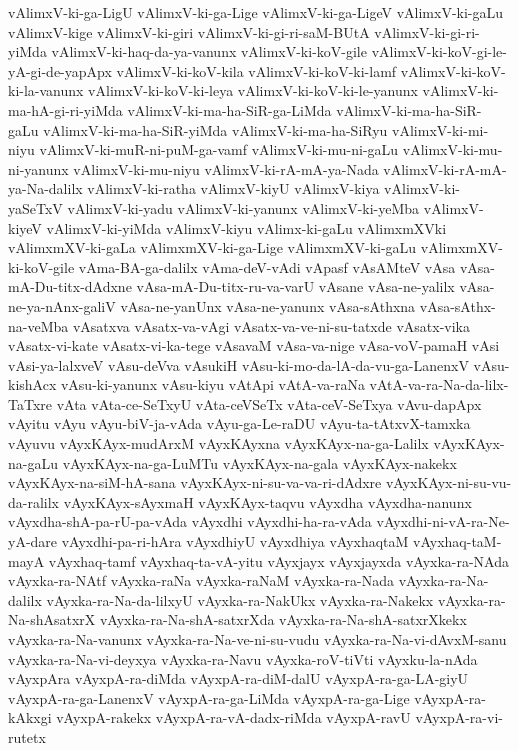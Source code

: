 {vAlimxV-ki-ga-LigU
vAlimxV-ki-ga-Lige
vAlimxV-ki-ga-LigeV
vAlimxV-ki-gaLu
vAlimxV-kige
vAlimxV-ki-giri
vAlimxV-ki-gi-ri-saM-BUtA
vAlimxV-ki-gi-ri-yiMda
vAlimxV-ki-haq-da-ya-vanunx
vAlimxV-ki-koV-gile
vAlimxV-ki-koV-gi-le-yA-gi-de-yapApx
vAlimxV-ki-koV-kila
vAlimxV-ki-koV-ki-lamf
vAlimxV-ki-koV-ki-la-vanunx
vAlimxV-ki-koV-ki-leya
vAlimxV-ki-koV-ki-le-yanunx
vAlimxV-ki-ma-hA-gi-ri-yiMda
vAlimxV-ki-ma-ha-SiR-ga-LiMda
vAlimxV-ki-ma-ha-SiR-gaLu
vAlimxV-ki-ma-ha-SiR-yiMda
vAlimxV-ki-ma-ha-SiRyu
vAlimxV-ki-mi-niyu
vAlimxV-ki-muR-ni-puM-ga-vamf
vAlimxV-ki-mu-ni-gaLu
vAlimxV-ki-mu-ni-yanunx
vAlimxV-ki-mu-niyu
vAlimxV-ki-rA-mA-ya-Nada
vAlimxV-ki-rA-mA-ya-Na-dalilx
vAlimxV-ki-ratha
vAlimxV-kiyU
vAlimxV-kiya
vAlimxV-ki-yaSeTxV
vAlimxV-ki-yadu
vAlimxV-ki-yanunx
vAlimxV-ki-yeMba
vAlimxV-kiyeV
vAlimxV-ki-yiMda
vAlimxV-kiyu
vAlimx-ki-gaLu
vAlimxmXVki
vAlimxmXV-ki-gaLa
vAlimxmXV-ki-ga-Lige
vAlimxmXV-ki-gaLu
vAlimxmXV-ki-koV-gile
vAma-BA-ga-dalilx
vAma-deV-vAdi
vApasf
vAsAMteV
vAsa
vAsa-mA-Du-titx-dAdxne
vAsa-mA-Du-titx-ru-va-varU
vAsane
vAsa-ne-yalilx
vAsa-ne-ya-nAnx-galiV
vAsa-ne-yanUnx
vAsa-ne-yanunx
vAsa-sAthxna
vAsa-sAthx-na-veMba
vAsatxva
vAsatx-va-vAgi
vAsatx-va-ve-ni-su-tatxde
vAsatx-vika
vAsatx-vi-kate
vAsatx-vi-ka-tege
vAsavaM
vAsa-va-nige
vAsa-voV-pamaH
vAsi
vAsi-ya-lalxveV
vAsu-deVva
vAsukiH
vAsu-ki-mo-da-lA-da-vu-ga-LanenxV
vAsu-kishAcx
vAsu-ki-yanunx
vAsu-kiyu
vAtApi
vAtA-va-raNa
vAtA-va-ra-Na-da-lilx-TaTxre
vAta
vAta-ce-SeTxyU
vAta-ceVSeTx
vAta-ceV-SeTxya
vAvu-dapApx
vAyitu
vAyu
vAyu-biV-ja-vAda
vAyu-ga-Le-raDU
vAyu-ta-tAtxvX-tamxka
vAyuvu
vAyxKAyx-mudArxM
vAyxKAyxna
vAyxKAyx-na-ga-Lalilx
vAyxKAyx-na-gaLu
vAyxKAyx-na-ga-LuMTu
vAyxKAyx-na-gala
vAyxKAyx-nakekx
vAyxKAyx-na-siM-hA-sana
vAyxKAyx-ni-su-va-va-ri-dAdxre
vAyxKAyx-ni-su-vu-da-ralilx
vAyxKAyx-sAyxmaH
vAyxKAyx-taqvu
vAyxdha
vAyxdha-nanunx
vAyxdha-shA-pa-rU-pa-vAda
vAyxdhi
vAyxdhi-ha-ra-vAda
vAyxdhi-ni-vA-ra-Ne-yA-dare
vAyxdhi-pa-ri-hAra
vAyxdhiyU
vAyxdhiya
vAyxhaqtaM
vAyxhaq-taM-mayA
vAyxhaq-tamf
vAyxhaq-ta-vA-yitu
vAyxjayx
vAyxjayxda
vAyxka-ra-NAda
vAyxka-ra-NAtf
vAyxka-raNa
vAyxka-raNaM
vAyxka-ra-Nada
vAyxka-ra-Na-dalilx
vAyxka-ra-Na-da-lilxyU
vAyxka-ra-NakUkx
vAyxka-ra-Nakekx
vAyxka-ra-Na-shAsatxrX
vAyxka-ra-Na-shA-satxrXda
vAyxka-ra-Na-shA-satxrXkekx
vAyxka-ra-Na-vanunx
vAyxka-ra-Na-ve-ni-su-vudu
vAyxka-ra-Na-vi-dAvxM-sanu
vAyxka-ra-Na-vi-deyxya
vAyxka-ra-Navu
vAyxka-roV-tiVti
vAyxku-la-nAda
vAyxpAra
vAyxpA-ra-diMda
vAyxpA-ra-diM-dalU
vAyxpA-ra-ga-LA-giyU
vAyxpA-ra-ga-LanenxV
vAyxpA-ra-ga-LiMda
vAyxpA-ra-ga-Lige
vAyxpA-ra-kAkxgi
vAyxpA-rakekx
vAyxpA-ra-vA-dadx-riMda
vAyxpA-ravU
vAyxpA-ra-vi-rutetx
}
